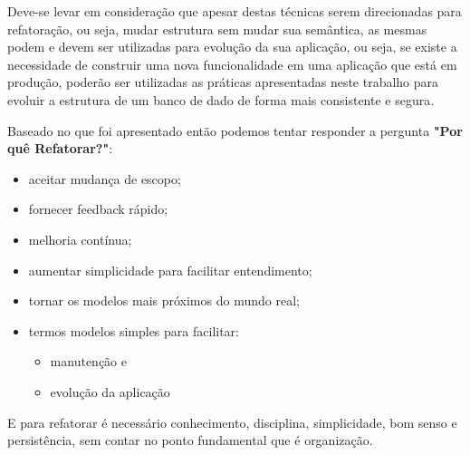 \documentclass[10pt]{article}
\begin{document}

\label{sec:consideracoes}

	Deve-se levar em consideração que apesar destas técnicas serem direcionadas para refatoração, ou seja, mudar estrutura sem mudar sua semântica, as mesmas podem e devem ser utilizadas para evolução da sua aplicação, ou seja, se existe a necessidade de construir uma nova funcionalidade em uma aplicação que está em produção, poderão ser utilizadas as práticas apresentadas neste trabalho para evoluir a estrutura de um banco de dado de forma mais consistente e segura.

	Baseado no que foi apresentado então podemos tentar responder a pergunta \textbf{"Por quê Refatorar?"}:

	\begin{itemize}
		\item aceitar mudança de escopo;
		\item fornecer feedback rápido;
		\item melhoria contínua;
		\item aumentar simplicidade para facilitar entendimento;
		\item tornar os modelos mais próximos do mundo real;
		\item termos modelos simples para facilitar:
		\begin{itemize}
			\item manutenção e
			\item evolução da aplicação
		\end{itemize}
	\end{itemize}

	E para refatorar é necessário conhecimento, disciplina, simplicidade, bom senso e persistência, sem contar no ponto fundamental que é organização.



\renewcommand\refname{Referências}



\end{document}
